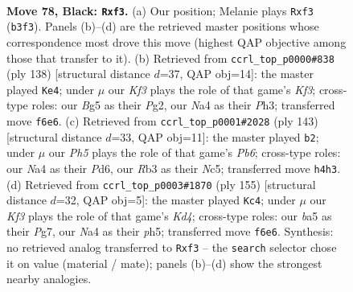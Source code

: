 \documentclass[11pt]{article}
\begin{document}
\clearpage

\begin{figure}[p]\centering
\begin{subfigure}{0.46\textwidth}\centering
\resizebox{\linewidth}{!}{%
\newchessgame
\chessboard[
  setfen={8/8/3p1k1p/B3p1b1/n1K1P2p/1r3P2/7R/8 b - - 5 78},
  showmover=false,
  pgfstyle=straightmove, color=movearrow, markmove={b3-f3}
]}
\caption{}
\end{subfigure}\hfill
\begin{subfigure}{0.46\textwidth}\centering
\resizebox{\linewidth}{!}{%
\newchessgame
\chessboard[
  setfen={8/8/p2p4/2pPb3/6Bk/1P3K1P/6P1/8 w - - 3 70},
  showmover=false,
  pgfstyle=straightmove, color=movearrow, markmove={f3-e4}
]}
\caption{}
\end{subfigure}
\\[4pt]
\begin{subfigure}{0.46\textwidth}\centering
\resizebox{\linewidth}{!}{%
\newchessgame
\chessboard[
  setfen={8/6k1/3p2p1/2n1bp2/1BB3P1/1p2K2P/8/1N6 b - - 5 72},
  showmover=false,
  pgfstyle=straightmove, color=movearrow, markmove={b3-b2}
]}
\caption{}
\end{subfigure}\hfill
\begin{subfigure}{0.46\textwidth}\centering
\resizebox{\linewidth}{!}{%
\newchessgame
\chessboard[
  setfen={8/R5p1/7p/2pk1p1P/3b1P2/6P1/4K3/8 b - - 6 78},
  showmover=false,
  pgfstyle=straightmove, color=movearrow, markmove={d5-c4}
]}
\caption{}
\end{subfigure}
\caption{\textbf{Move 78, Black: \texttt{Rxf3}.} (a) Our position; Melanie plays \texttt{Rxf3} (\texttt{b3f3}). Panels (b)--(d) are the retrieved master positions whose correspondence most drove this move (highest QAP objective among those that transfer to it). (b) Retrieved from \texttt{ccrl\_top\_p0000\#838} (ply 138) [structural distance $d$=37, QAP obj=14]: the master played \texttt{Ke4}; under $\mu$ our \emph{Kf3} plays the role of that game's \emph{Kf3}; cross-type roles: our \emph{B}g5 as their \emph{P}g2, our \emph{N}a4 as their \emph{P}h3; transferred move \texttt{f6e6}. (c) Retrieved from \texttt{ccrl\_top\_p0001\#2028} (ply 143) [structural distance $d$=33, QAP obj=11]: the master played \texttt{b2}; under $\mu$ our \emph{Ph5} plays the role of that game's \emph{Pb6}; cross-type roles: our \emph{N}a4 as their \emph{P}d6, our \emph{R}b3 as their \emph{N}c5; transferred move \texttt{h4h3}. (d) Retrieved from \texttt{ccrl\_top\_p0003\#1870} (ply 155) [structural distance $d$=32, QAP obj=5]: the master played \texttt{Kc4}; under $\mu$ our \emph{Kf3} plays the role of that game's \emph{Kd4}; cross-type roles: our \emph{b}a5 as their \emph{P}g7, our \emph{N}a4 as their \emph{p}h5; transferred move \texttt{f6e6}. Synthesis: no retrieved analog transferred to \texttt{Rxf3} -- the \texttt{search} selector chose it on value (material / mate); panels (b)--(d) show the strongest nearby analogies.}
\label{fig:thought-m155}
\end{figure}
\end{document}
